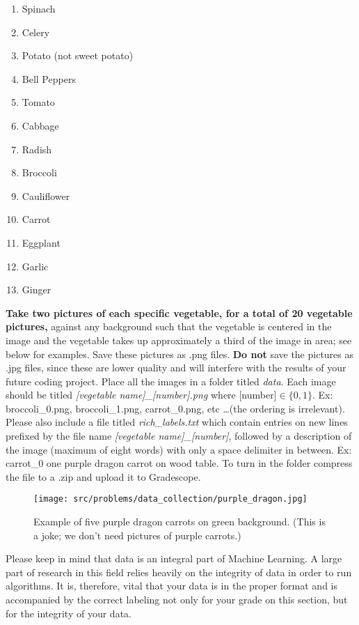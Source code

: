 \begin{enumerate}
\item Spinach
\item Celery
\item Potato (not sweet potato)
\item Bell Peppers
\item Tomato
\item Cabbage
\item Radish
\item Broccoli
\item Cauliflower
\item Carrot
\item Eggplant
\item Garlic
\item Ginger
\end{enumerate}


{\bf Take two pictures of each specific vegetable, for a total of 20 vegetable pictures,} against any background such that the vegetable is centered in the image and the vegetable takes up approximately a third of the image in area; see below for examples. Save these pictures as .png files. {\bf Do not} save the pictures as .jpg files, since these are lower quality and will interfere with the results of your future coding project. Place all the images in a folder titled \emph{data}. Each image should be titled \emph{[vegetable name]\_[number].png} where [number]$\in \{0, 1\}$. Ex: broccoli\_0.png, broccoli\_1.png, carrot\_0.png, etc \ldots (the ordering is irrelevant). Please also include a file titled \emph{rich\_labels.txt} which contain entries on new lines prefixed by the file name \emph{[vegetable name]\_[number]}, followed by a description of the image (maximum of eight words) with only a space delimiter in between. Ex: carrot\_0 one purple dragon carrot on wood table. To turn in the folder compress the file to a .zip and upload it to Gradescope.

\begin{figure}[h!]
    \begin{center}
    \texttt{[image: src/problems/data\_collection/purple\_dragon.jpg]}
    \caption{Example of five purple dragon carrots on green background. (This is a joke; we don't need pictures of purple carrots.)} \label{fig:robot}
    \end{center}
\end{figure}

Please keep in mind that data is an integral part of Machine Learning. A large part of research in this field relies heavily on the integrity of data in order to run algorithms. It is, therefore, vital that your data is in the proper format and is accompanied by the correct labeling not only for your grade on this section, but for the integrity of your data.

